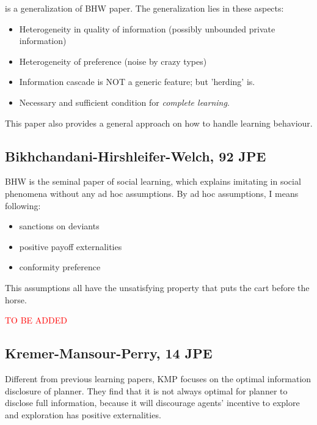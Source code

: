 \documentclass{book}
\theoremstyle{plain}
\theoremstyle{definition}
\begin{document}
\cite{Smith:2000tz} is a generalization of BHW paper. The generalization lies in these aspects:
\begin{itemize}
	\setlength{\itemsep}{0pt}
	\item Heterogeneity in quality of information (possibly unbounded private information)
	\item Heterogeneity of preference (noise by crazy types)
	\item Information cascade is NOT a generic feature; but 'herding' is.
	\item Necessary and sufficient condition for \textit{complete learning}.
\end{itemize}
This paper also provides a general approach on how to handle learning behaviour.

\subsection{Bikhchandani-Hirshleifer-Welch, 92 JPE} %
\label{subsec:bikhchandani_hirshleifer_welch_92_jpe}

\textbf{}

BHW is the seminal paper of social learning, which explains imitating in social phenomena without any ad hoc assumptions. By ad hoc assumptions, I means following:
\begin{itemize}
	\setlength{\itemsep}{0pt}
	\item sanctions on deviants
	\item positive payoff externalities
	\item conformity preference
\end{itemize}
This assumptions all have the unsatisfying property that puts the cart before the horse.

\textcolor{red}{TO BE ADDED}




\subsection{Kremer-Mansour-Perry, 14 JPE} %
\label{subsec:kremer_mansour_perry_14_jpe}

\textbf{}

Different from previous learning papers, KMP focuses on the optimal information disclosure of planner.
They find that it is not always optimal for planner to disclose full information, because it will discourage agents' incentive to explore and exploration has positive externalities.
\end{document}
